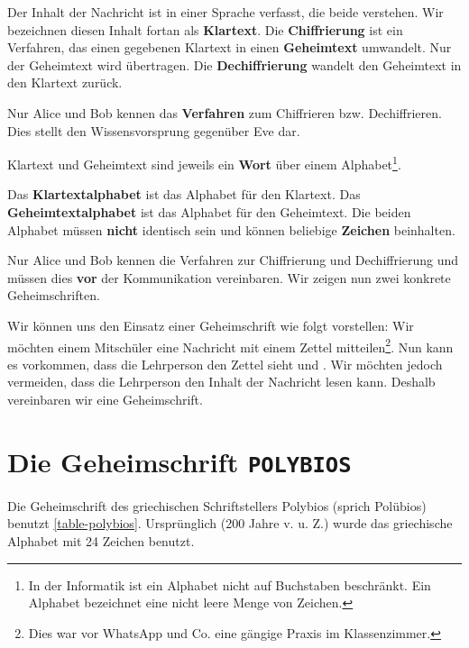Der Inhalt der Nachricht ist in einer Sprache verfasst, die beide verstehen. Wir bezeichnen diesen Inhalt fortan als \textbf{Klartext}. Die \textbf{Chiffrierung} ist ein Verfahren, das einen gegebenen Klartext in einen \textbf{Geheimtext} umwandelt. Nur der Geheimtext wird übertragen. Die \textbf{Dechiffrierung} wandelt den Geheimtext in den Klartext zurück.

\begin{important}
Nur Alice und Bob kennen das \textbf{Verfahren} zum Chiffrieren bzw. Dechiffrieren. Dies stellt den Wissensvorsprung gegenüber Eve dar.
\end{important}

Klartext und Geheimtext sind jeweils ein \textbf{Wort} über einem Alphabet\footnote{In der Informatik ist ein Alphabet nicht auf Buchstaben beschränkt. Ein Alphabet bezeichnet eine nicht leere Menge von Zeichen.}.

\begin{definition}
Das \textbf{Klartextalphabet} ist das Alphabet für den Klartext. Das \textbf{Geheimtextalphabet} ist das Alphabet für den Geheimtext. Die beiden Alphabet müssen \textbf{nicht} identisch sein und können beliebige \textbf{Zeichen} beinhalten.
\end{definition}

Nur Alice und Bob kennen die Verfahren zur Chiffrierung und Dechiffrierung und müssen dies \textbf{vor} der Kommunikation vereinbaren. Wir zeigen nun zwei konkrete Geheimschriften.

\begin{hinweis}
	Wir können uns den Einsatz einer Geheimschrift wie folgt vorstellen: Wir möchten einem Mitschüler eine Nachricht mit einem Zettel mitteilen\footnote{Dies war vor WhatsApp und Co. eine gängige Praxis im Klassenzimmer.}. Nun kann es vorkommen, dass die Lehrperson den Zettel sieht und . Wir möchten jedoch vermeiden, dass die Lehrperson den Inhalt der Nachricht lesen kann. Deshalb vereinbaren wir eine Geheimschrift.
\end{hinweis}

\section{Die Geheimschrift \texttt{POLYBIOS}}

Die Geheimschrift des griechischen Schriftstellers Polybios (sprich Polübios) benutzt \autoref{table-polybios}. Ursprünglich (\num{200} Jahre v. u. Z.) wurde das griechische Alphabet mit \num{24} Zeichen benutzt.


